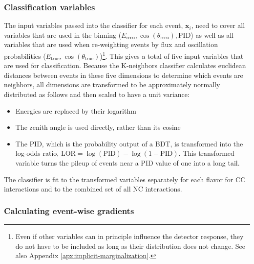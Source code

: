 \subsubsection{Classification variables}
The input variables passed into the classifier for each event, $\boldsymbol{x}_i$, need to cover all variables that are used in the binning ($E_{\mathrm{reco}},\cos(\theta_{\mathrm{reco}}),{\mathrm{PID}}$) as well as all variables that are used when re-weighting events by flux and oscillation probabilities ($E_{\mathrm{true}},\cos(\theta_{\mathrm{true}})$)\footnote{Even if other variables can in principle influence the detector response, they do not have to be included as long as their distribution does not change.
See also Appendix \ref{apx:implicit-marginalization}.}.
This gives a total of five input variables that are used for classification.
Because the K-neighbors classifier calculates euclidean distances between events in these five dimensions to determine which events are neighbors, all dimensions are transformed to be approximately normally distributed as follows and then scaled to have a unit variance:
\begin{itemize}
    \item Energies are replaced by their logarithm
    \item The zenith angle is used directly, rather than its cosine
    \item The PID, which is the probability output of a BDT, is transformed into the log-odds ratio, $\mathrm{LOR}=\log({\mathrm{PID}}) - \log(1-{\mathrm{PID}})$.
This transformed variable turns the pileup of events near a PID value of one into a long tail.
\end{itemize}
The classifier is fit to the transformed variables separately for each flavor for CC interactions and to the combined set of all NC interactions.

\subsubsection{Calculating event-wise gradients}

